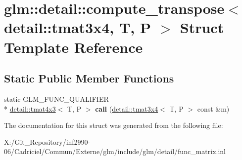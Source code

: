 \hypertarget{structglm_1_1detail_1_1compute__transpose_3_01detail_1_1tmat3x4_00_01_t_00_01_p_01_4}{\section{glm\-:\-:detail\-:\-:compute\-\_\-transpose$<$ detail\-:\-:tmat3x4, T, P $>$ Struct Template Reference}
\label{structglm_1_1detail_1_1compute__transpose_3_01detail_1_1tmat3x4_00_01_t_00_01_p_01_4}
}
\subsection*{Static Public Member Functions}
\begin{DoxyCompactItemize}
\item 
\hypertarget{structglm_1_1detail_1_1compute__transpose_3_01detail_1_1tmat3x4_00_01_t_00_01_p_01_4_a1cd1f07ec6c02b790e15ae86c40fb5b0}{static G\-L\-M\-\_\-\-F\-U\-N\-C\-\_\-\-Q\-U\-A\-L\-I\-F\-I\-E\-R \\*
\hyperlink{structglm_1_1detail_1_1tmat4x3}{detail\-::tmat4x3}$<$ T, P $>$ {\bfseries call} (\hyperlink{structglm_1_1detail_1_1tmat3x4}{detail\-::tmat3x4}$<$ T, P $>$ const \&m)}\label{structglm_1_1detail_1_1compute__transpose_3_01detail_1_1tmat3x4_00_01_t_00_01_p_01_4_a1cd1f07ec6c02b790e15ae86c40fb5b0}

\end{DoxyCompactItemize}


The documentation for this struct was generated from the following file\-:\begin{DoxyCompactItemize}
\item 
X\-:/\-Git\-\_\-\-Repository/inf2990-\/06/\-Cadriciel/\-Commun/\-Externe/glm/include/glm/detail/func\-\_\-matrix.\-inl\end{DoxyCompactItemize}
